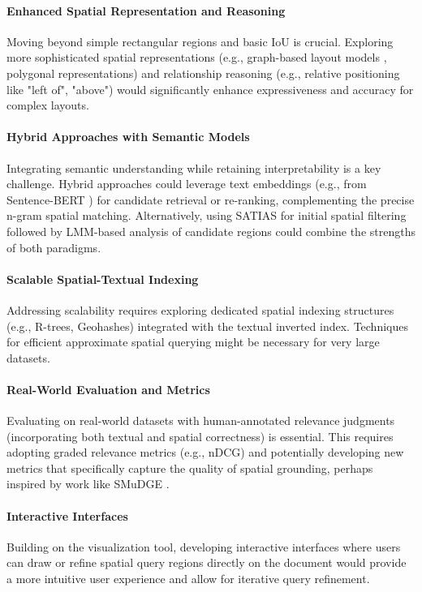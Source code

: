 \documentclass[manuscript,screen]{acmart}
\begin{document}
\paragraph{Enhanced Spatial Representation and Reasoning}
Moving beyond simple rectangular regions and basic IoU is crucial. Exploring more sophisticated spatial representations (e.g., graph-based layout models \cite{Johnson18SceneGraphs}, polygonal representations) and relationship reasoning (e.g., relative positioning like "left of", "above") would significantly enhance expressiveness and accuracy for complex layouts.

\paragraph{Hybrid Approaches with Semantic Models}
Integrating semantic understanding while retaining interpretability is a key challenge. Hybrid approaches could leverage text embeddings (e.g., from Sentence-BERT \cite{Reimers19SentenceBERT}) for candidate retrieval or re-ranking, complementing the precise n-gram spatial matching. Alternatively, using SATIAS for initial spatial filtering followed by LMM-based analysis of candidate regions could combine the strengths of both paradigms.

\paragraph{Scalable Spatial-Textual Indexing}
Addressing scalability requires exploring dedicated spatial indexing structures (e.g., R-trees, Geohashes) integrated with the textual inverted index. Techniques for efficient approximate spatial querying might be necessary for very large datasets.

\paragraph{Real-World Evaluation and Metrics}
Evaluating on real-world datasets with human-annotated relevance judgments (incorporating both textual and spatial correctness) is essential. This requires adopting graded relevance metrics (e.g., nDCG) and potentially developing new metrics that specifically capture the quality of spatial grounding, perhaps inspired by work like SMuDGE \cite{Nguyen25}.

\paragraph{Interactive Interfaces}
Building on the visualization tool, developing interactive interfaces where users can draw or refine spatial query regions directly on the document would provide a more intuitive user experience and allow for iterative query refinement.
\end{document}
